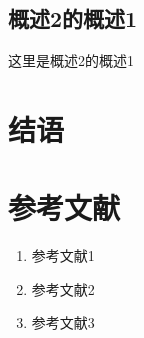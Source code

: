 \documentclass[a4paper,12pt]{article}
\begin{document}
\subsection{概述2的概述1}
这里是概述2的概述1

\section*{结语} %

\section*{参考文献}
\begin{enumerate}
	\item 参考文献1
	\item 参考文献2
	\item 参考文献3
\end{enumerate}
\end{document}
